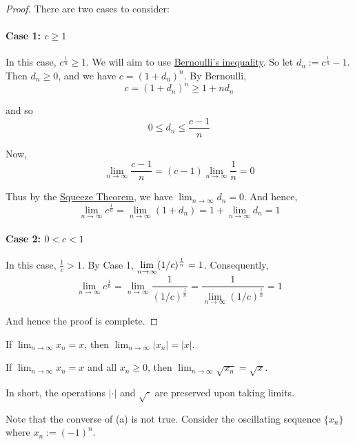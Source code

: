 \begin{proof}
  \def\limn{\displaystyle\lim_{n\to\infty}}
  There are two cases to consider:

  \paragraph{Case 1: $c\geq1$}

  In this case, $c^\frac1n\geq1$. We will aim to use \href{d44713f}{Bernoulli's
  inequality}. So let $d_n:=c^\frac1n-1$. Then $d_n\geq0$, and we have
  $c=(1+d_n)^n$. By Bernoulli,
  $$
    c=(1+d_n)^n\geq1+nd_n
  $$

  and so
  $$
    0\leq d_n\leq\frac{c-1}n
  $$

  Now,
  $$
    \limn\frac{c-1}n=(c-1)\limn\frac1n=0
  $$

  Thus by the \href{c3364d9}{Squeeze Theorem}, we have $\limn d_n=0$. And
  hence,
  $$
    \limn c^\frac1n=\limn(1+d_n)=1+\limn d_n=1
  $$

  \paragraph{Case 2: $0<c<1$}

  In this case, $\frac1c>1$. By Case 1, $\displaystyle\limn(1/c)^\frac1n=1$.
  Consequently,
  $$
    \limn c^\frac1n=\limn\frac1{(1/c)^\frac1n}=\frac1{\limn(1/c)^\frac1n}=1
  $$

  And hence the proof is complete.
\end{proof}

\label{be3d800}

\begin{enumerata}
  \item If $\displaystyle\lim_{n\to\infty}x_n=x$, then
        $\displaystyle\lim_{n\to\infty}|x_n|=|x|$.
  \item If $\displaystyle\lim_{n\to\infty}x_n=x$ and all $x_n\geq0$, then
        $\displaystyle\lim_{n\to\infty}\sqrt{x_n}=\sqrt x$.
\end{enumerata}

In short, the operations $|\cdot|$ and $\sqrt\cdot$ are preserved upon taking
limits.

Note that the converse of (a) is not true. Consider the oscillating sequence
$\{x_n\}$ where $x_n:=(-1)^n$.

